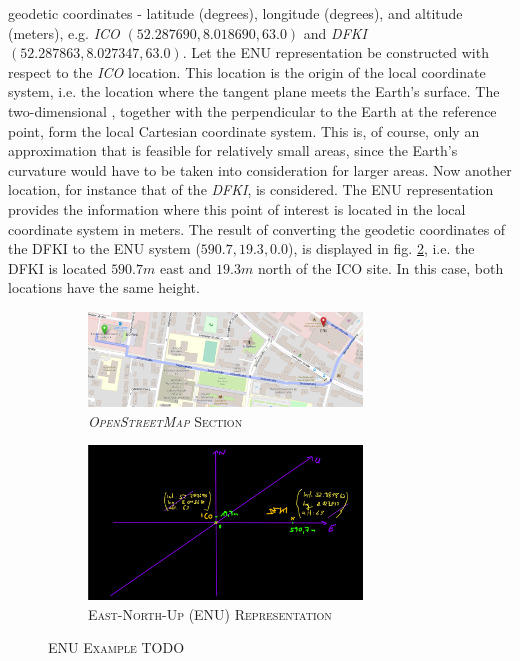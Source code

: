 \documentclass[english, master, utf8]{base/thesis_KBS}
\begin{document}
geodetic coordinates - latitude (degrees), longitude (degrees), and altitude (meters), e.g. \textit{ICO} $(52.287690, 8.018690, 63.0)$ and \textit{DFKI} $(52.287863, 8.027347, 63.0)$.
Let the ENU representation be constructed with respect to the \textit{ICO} location. This location is the origin of the local coordinate system, i.e. the location where the tangent
plane meets the Earth's surface. The two-dimensional , together with the  perpendicular to the Earth at the reference point, form
the local Cartesian coordinate system. This is, of course, only an approximation that is feasible for relatively small areas, since the Earth's curvature would have to be taken
into consideration for larger areas. Now another location, for instance that of the \textit{DFKI}, is considered. The ENU representation provides the information where this point
of interest is located in the local coordinate system in meters. The result of converting the geodetic coordinates of the DFKI to the ENU system ($590.7, 19.3, 0.0$), is displayed
in fig. \ref{fig:ICO_DFKI_ENU}, i.e. the DFKI is located $590.7 m$ east and $19.3 m$ north of the ICO site. In this case, both locations have the same height.
\begin{figure}[H]
    \centering
    \begin{subfigure}[b]{0.49\textwidth}
        \centering
        \includegraphics[width=0.8\textwidth]{pics/ICO_DFKI_map.png}
        \caption{\textsc{\textit{OpenStreetMap} Section}}
        \label{fig:ICO_DFKI_map}
    \end{subfigure}
    \hfill
    \begin{subfigure}[b]{0.49\textwidth}
        \centering
        \includegraphics[width=0.8\textwidth]{pics/ICO_DFKI_ENU.png}
        \caption{\textsc{East-North-Up (ENU) Representation}}
        \label{fig:ICO_DFKI_ENU}
    \end{subfigure}
\caption{\textsc{ENU Example} TODO}
\label{fig:ENU_example}
\end{figure}
\end{document}
